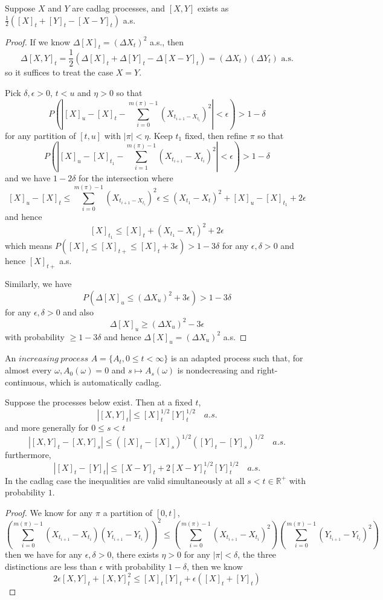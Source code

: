 \documentclass[lang=en, color=blue, ]{elegantbook}
\newcommand{\R}{\mathbb{R}}
\begin{document}
\begin{proposition}
    Suppose $X$ and $Y$ are cadlag processes, and $[X,Y]$ exists as $\tfrac{1}{2}([X]_t+[Y]_t-[X-Y]_t)$ a.s.\par
\end{proposition}
\begin{proof}
    If we know $\Delta [X]_t = (\Delta X_t)^2$ a.s., then
    \[\Delta [X,Y]_t = \dfrac{1}{2}(\Delta [X]_t+\Delta[Y]_t-\Delta[X-Y]_t) = (\Delta X_t)(\Delta Y_t)\text{ a.s.}\]
    so it suffices to treat the case $X=Y$.\par
    Pick $\delta,\epsilon > 0$, $t<u$ and $\eta > 0$ so that
    \[P(|[X]_u-[X]_t-\sum\limits_{i=0}^{m(\pi)-1} (X_{t_{i+1}- X_{t_i}})^2|<\epsilon) > 1-\delta\]
    for any partition of $[t,u]$ with $|\pi|<\eta$. Keep $t_1$ fixed, then refine $\pi$ so that
    \[P(|[X]_u-[X]_{t_1}-\sum\limits_{i=1}^{m(\pi)-1}(X_{t_{i+1}}-X_{t_i})^2|<\epsilon) > 1-\delta\]
    and we have $1-2\delta$ for the intersection where
    \[[X]_u-[X]_t \leq \sum\limits_{i=0}^{m(\pi)-1} (X_{t_{i+1}-X_{t_i}})^2 \epsilon  \leq (X_{t_1}-X_t)^2+[X]_u-[X]_{t_1}+2\epsilon\]
    and hence
    \[[X]_{t_1} \leq [X]_t + (X_{t_1}-X_t)^2 + 2\epsilon\]
    which means $P([X]_t \leq [X]_{t+} \leq [X]_t + 3\epsilon) > 1-3\delta$ for any $\epsilon ,\delta > 0$ and hence $[X]_{t+}$ a.s.\par
    Similarly, we have
    \[P(\Delta [X]_u \leq (\Delta X_u)^2 + 3\epsilon) > 1-3\delta\]
    for any $\epsilon,\delta > 0$ and also
    \[\Delta [X]_u \geq (\Delta X_u)^2 - 3\epsilon\]
    with probability $\geq 1-3\delta$ and hence $\Delta [X]_u = (\Delta X_u)^2$ a.s.
\end{proof}

\begin{definition}
    An $increasing\ process$ $A = \{A_t, 0 \leq t < \infty\}$ is an adapted process such that, for almost every $\omega, A_0(\omega) = 0$ and $s\mapsto A_s(\omega)$ is nondecreasing and right-continuous, which is automatically cadlag.
\end{definition}

\begin{lemma}
    Suppose the processes below exist. Then at a fixed $t$,
    \[|[X,Y]_t| \leq [X]_t^{1/2}[Y]_t^{1/2}\quad a.s.\]
    and more generally for $0 \leq s < t$
    \[|[X,Y]_t-[X,Y]_s| \leq ([X]_t-[X]_s)^{1/2}([Y]_t-[Y]_s)^{1/2}\quad a.s.\]
    furthermore,
    \[|[X]_t-[Y]_t| \leq [X-Y]_t + 2[X-Y]_t^{1/2}[Y]_t^{1/2}\quad a.s.\]
    In the cadlag case the inequalities are valid simultaneously at all $s < t\in\R^+$ with probability $1$.
\end{lemma}
\begin{proof}
    We know for any $\pi$ a partition of $[0,t]$,
    \[(\sum\limits_{i=0}^{m(\pi)-1} (X_{t_{i+1}}-X_{t_i})(Y_{t_{i+1}}-Y_{t_i}))^2 \leq (\sum\limits_{i=0}^{m(\pi)-1} (X_{t_{i+1}}-X_{t_i})^2)(\sum\limits_{i=0}^{m(\pi)-1} (Y_{t_{i+1}}-Y_{t_i})^2)\]
    then we have for any $\epsilon, \delta > 0$, there exists $\eta > 0$ for any $|\pi| < \delta$, the three distinctions are less than $\epsilon$ with probability $1-\delta$, then we know
    \[2\epsilon[X,Y]_t + [X,Y]_t^2 \leq [X]_t[Y]_t + \epsilon([X]_t+[Y]_t)\]
\end{proof}
\end{document}
